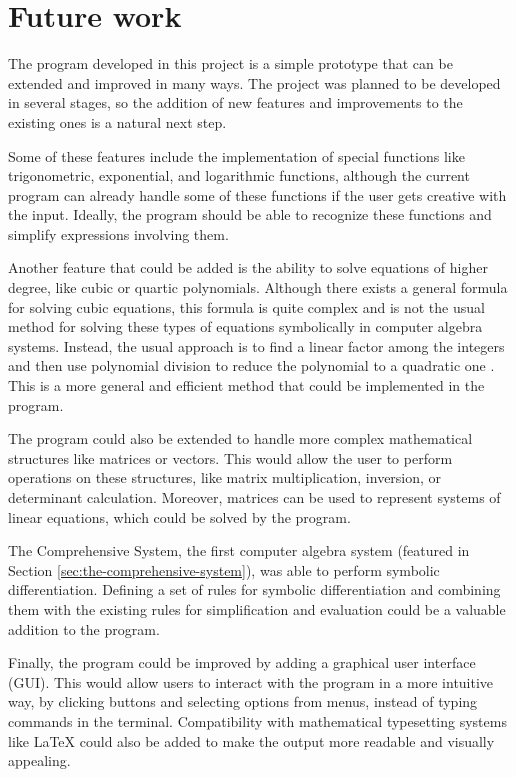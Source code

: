 \section{Future work}\label{sec:future-work}

The program developed in this project is a simple prototype that can be extended and improved in many ways. The project was planned to be developed in several stages, so the addition of new features and improvements to the existing ones is a natural next step.

Some of these features include the implementation of special functions like trigonometric, exponential, and logarithmic functions, although the current program can already handle some of these functions if the user gets creative with the input. Ideally, the program should be able to recognize these functions and simplify expressions involving them.

Another feature that could be added is the ability to solve equations of higher degree, like cubic or quartic polynomials. Although there exists a general formula for solving cubic equations, this formula is quite complex and is not the usual method for solving these types of equations symbolically in computer algebra systems. Instead, the usual approach is to find a linear factor among the integers and then use polynomial division to reduce the polynomial to a quadratic one \parencite{davenport1994computer}. This is a more general and efficient method that could be implemented in the program.

The program could also be extended to handle more complex mathematical structures like matrices or vectors. This would allow the user to perform operations on these structures, like matrix multiplication, inversion, or determinant calculation. Moreover, matrices can be used to represent systems of linear equations, which could be solved by the program.

The Comprehensive System, the first computer algebra system (featured in Section \ref{sec:the-comprehensive-system}), was able to perform symbolic differentiation. Defining a set of rules for symbolic differentiation and combining them with the existing rules for simplification and evaluation could be a valuable addition to the program.

Finally, the program could be improved by adding a graphical user interface (GUI). This would allow users to interact with the program in a more intuitive way, by clicking buttons and selecting options from menus, instead of typing commands in the terminal. Compatibility with mathematical typesetting systems like \LaTeX{} could also be added to make the output more readable and visually appealing.

